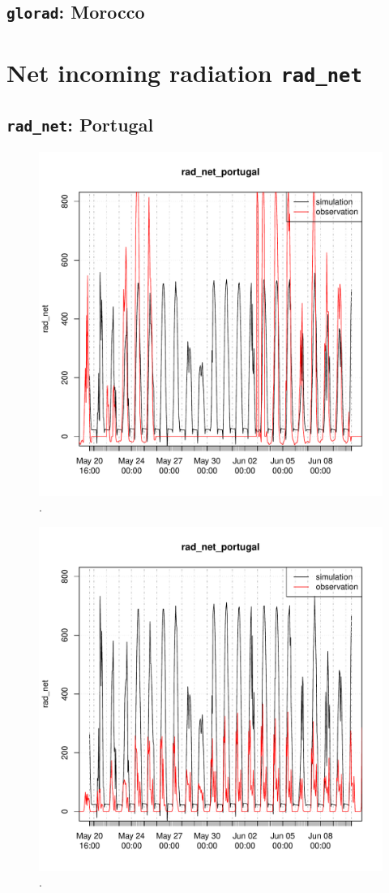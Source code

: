 \documentclass{scrreprt}
\begin{document}
\subsection{\texttt{glorad}: Morocco}

\section{Net incoming radiation \texttt{rad\_net}}

\subsection{\texttt{rad\_net}: Portugal}

\begin{figure}[ht]
  \centering
  \includegraphics[width=0.8\hsize]{./plot_rad_net_compare_portugal_HS_2014-04-29_2014-07-01.pdf}
  \caption{.}
  \label{fig:portugal_HS_radnet1}
\end{figure}

\begin{figure}[ht]
  \centering
  \includegraphics[width=0.8\hsize]{./plot_rad_net_compare_portugal_NSA_2014-04-29_2014-07-01.pdf}
  \caption{.}
  \label{fig:portugal_NSA_radnet1}
\end{figure}
\end{document}
